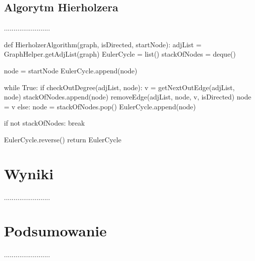 \documentclass[a4paper, 12pt, twoside, openright]{article}
\begin{document}
\subsection{Algorytm Hierholzera}
\indent\par
........................
\captionsetup{justification=centering}
\begin{algorithm}[caption={\textit{HierholzerAlgorithm} funkcja wyznaczająca ścieżkę dla grafów skierowanych i nieskierowanych }, label={makeeulerianDG}]
def HierholzerAlgorithm(graph, isDirected, startNode):
	adjList = GraphHelper.getAdjList(graph)
	EulerCycle = list()
	stackOfNodes = deque()
	
	node = startNode
	EulerCycle.append(node)
	
	while True:
		if checkOutDegree(adjList, node):
			v = getNextOutEdge(adjList, node)
			stackOfNodes.append(node)
			removeEdge(adjList, node, v, isDirected)
			node = v
		else:
			node = stackOfNodes.pop()
			EulerCycle.append(node)
		
		if not stackOfNodes:
			break
		
	EulerCycle.reverse()
	return EulerCycle
\end{algorithm}



\newpage
\section{Wyniki}
\par\indent
........................



\newpage
\section{Podsumowanie}
\indent\par
........................
\end{document}
